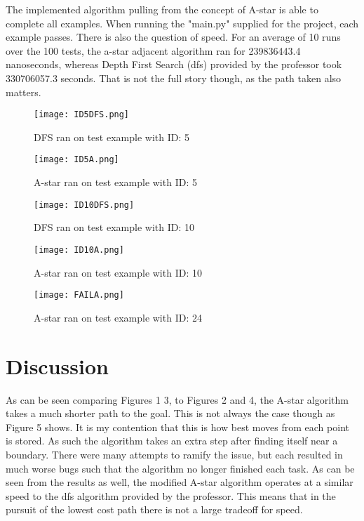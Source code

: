 \documentclass[letterpaper, 10 pt, conference]{ieeeconf}   %
\begin{document}
The implemented algorithm pulling from the concept of A-star is able to complete all examples. When running the "main.py" supplied for the project, each example passes. There is also the question of speed. For an average of 10 runs over the 100 tests, the a-star adjacent algorithm ran for 239836443.4 nanoseconds, whereas Depth First Search (dfs) provided by the professor took 330706057.3 seconds. That is not the full story though, as the path taken also matters.
\begin{figure}[thpb]
	\centering
	\texttt{[image: ID5DFS.png]}
	\caption{DFS ran on test example with ID: 5}
	\label{figurelabel}
\end{figure}
\begin{figure}[thpb]
	\centering
	\texttt{[image: ID5A.png]}
	\caption{A-star ran on test example with ID: 5}
	\label{figurelabel}
\end{figure}
\begin{figure}[thpb]
	\centering
	\texttt{[image: ID10DFS.png]}
	\caption{DFS ran on test example with ID: 10}
	\label{figurelabel}
\end{figure}
\begin{figure}[thpb]
	\centering
	\texttt{[image: ID10A.png]}
	\caption{A-star ran on test example with ID: 10}
	\label{figurelabel}
\end{figure}
\begin{figure}[thpb]
	\centering
	\texttt{[image: FAILA.png]}
	\caption{A-star ran on test example with ID: 24}
	\label{figurelabel}
\end{figure}

\section{Discussion}
As can be seen comparing Figures 1  3, to Figures 2 and 4, the A-star algorithm takes a much shorter path to the goal. This is not always the case though as Figure 5 shows. It is my contention that this is how best moves from each point is stored. As such the algorithm takes an extra step after finding itself near a boundary. There were many attempts to ramify the issue, but each resulted in much worse bugs such that the algorithm no longer finished each task. As can be seen from the results as well, the modified A-star algorithm operates at a similar speed to the dfs algorithm provided by the professor. This means that in the pursuit of the lowest cost path there is not a large tradeoff for speed.
\end{document}
